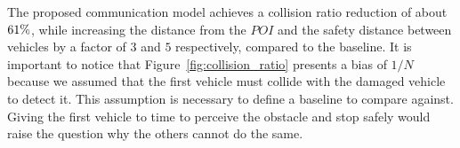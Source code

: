 The proposed communication model achieves a collision ratio reduction of about $\collision_ratio_reduction_perc\%$,
while increasing the distance from the $POI$ and the safety distance between vehicles by a factor of
$3$ and $5$ respectively, compared to the baseline.
It is important to notice that Figure~\ref{fig:collision_ratio} presents a bias of $1/N$ because we assumed that
the first vehicle must collide with the damaged vehicle to detect it. This assumption is necessary to define a
baseline to compare against. Giving the first vehicle to time to perceive the obstacle and stop safely would
raise the question why the others cannot do the same.

